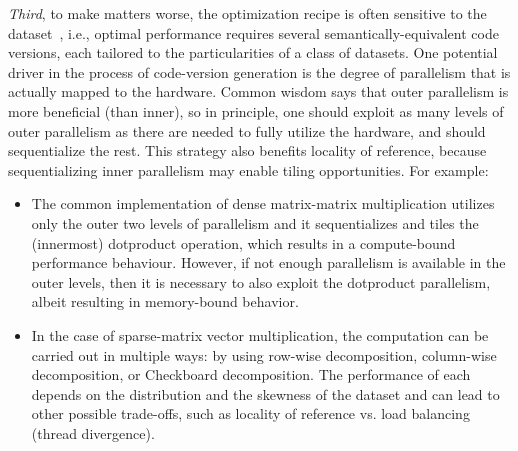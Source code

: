 
{\em Third}, to make matters worse, the optimization recipe is often sensitive to the dataset~\cite{FinPar:TACO}, i.e., optimal performance requires several semantically-equivalent code versions, each tailored to the particularities of a class of datasets.   One potential driver in the process of code-version generation is the degree of parallelism that is actually mapped to the hardware. Common wisdom says that outer parallelism is more beneficial (than inner), so in principle, one should exploit as many levels of outer parallelism as there are needed to fully utilize the hardware, and should sequentialize the rest.  This strategy also benefits locality of reference, because sequentializing inner parallelism may enable tiling opportunities. For example:
\begin{itemize}
    \item The common implementation of dense matrix-matrix multiplication utilizes only the outer two levels of parallelism and it sequentializes and tiles the (innermost) dotproduct operation, which results in a compute-bound performance behaviour.   However, if not enough parallelism is available in the outer levels, then it is necessary to also exploit the dotproduct parallelism, albeit resulting in memory-bound behavior.
    \item In the case of sparse-matrix vector multiplication, the computation can be carried out in multiple ways: by using row-wise decomposition, column-wise decomposition, or Checkboard decomposition.   The performance of each depends on the distribution and the skewness of the dataset and can lead to other possible trade-offs, such as locality of reference vs. load balancing (thread divergence).
\end{itemize}

